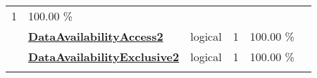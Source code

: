 \documentclass[]{article}
\begin{document}
\begin{longtable}[]{@{}lllrcl@{}}
\begin{minipage}[t]{0.10\columnwidth}
1\strut
\end{minipage} & \begin{minipage}[t]{0.10\columnwidth}\centering\strut
100.00 \%\strut
\end{minipage} & \begin{minipage}[t]{0.12\columnwidth}\raggedright\strut
\strut
\end{minipage}\tabularnewline
\begin{minipage}[t]{0.07\columnwidth}\raggedright\strut
\strut
\end{minipage} & \begin{minipage}[t]{0.35\columnwidth}\raggedright\strut
\textbf{\protect\hyperlink{dataavailabilityaccess2}{DataAvailabilityAccess2}}\strut
\end{minipage} & \begin{minipage}[t]{0.11\columnwidth}\raggedright\strut
logical\strut
\end{minipage} & \begin{minipage}[t]{0.10\columnwidth}\raggedleft\strut
1\strut
\end{minipage} & \begin{minipage}[t]{0.10\columnwidth}\centering\strut
100.00 \%\strut
\end{minipage} & \begin{minipage}[t]{0.12\columnwidth}\raggedright\strut
\strut
\end{minipage}\tabularnewline
\begin{minipage}[t]{0.07\columnwidth}\raggedright\strut
\strut
\end{minipage} & \begin{minipage}[t]{0.35\columnwidth}\raggedright\strut
\textbf{\protect\hyperlink{dataavailabilityexclusive2}{DataAvailabilityExclusive2}}\strut
\end{minipage} & \begin{minipage}[t]{0.11\columnwidth}\raggedright\strut
logical\strut
\end{minipage} & \begin{minipage}[t]{0.10\columnwidth}\raggedleft\strut
1\strut
\end{minipage} & \begin{minipage}[t]{0.10\columnwidth}\centering\strut
100.00 \%\strut
\end{minipage} & \begin{minipage}[t]{0.12\columnwidth}\raggedright\strut
\strut
\end{minipage}\tabularnewline
\begin{minipage}[t]{0.07\columnwidth}\raggedright\strut

\end{minipage}
\end{longtable}
\end{document}

